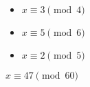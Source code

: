 \begin{itemize}[noitemsep]
  \item $x \equiv 3 \pmod 4$
  \item $x \equiv 5 \pmod 6$
  \item $x \equiv 2 \pmod 5$
\end{itemize}

$x \equiv 47 \pmod{60} $ \\